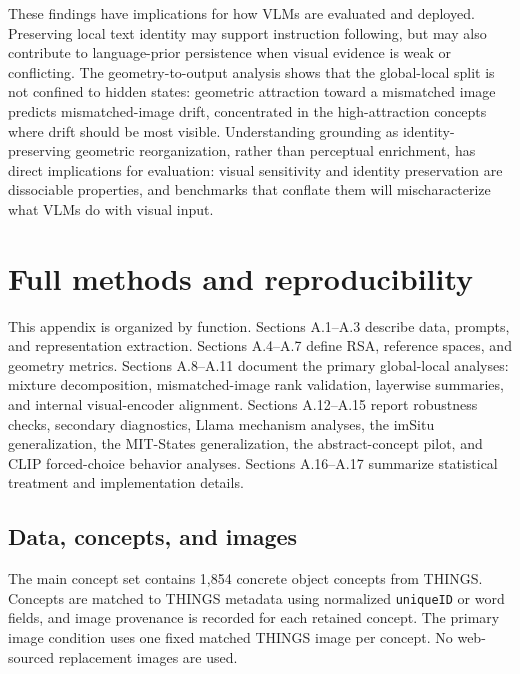 \documentclass{article}
\begin{document}
These findings have implications for how VLMs are evaluated and deployed. Preserving local text identity may support instruction following, but may also contribute to language-prior persistence when visual evidence is weak or conflicting. The geometry-to-output analysis shows that the global-local split is not confined to hidden states: geometric attraction toward a mismatched image predicts mismatched-image drift, concentrated in the high-attraction concepts where drift should be most visible. Understanding grounding as identity-preserving geometric reorganization, rather than perceptual enrichment, has direct implications for evaluation: visual sensitivity and identity preservation are dissociable properties, and benchmarks that conflate them will mischaracterize what VLMs do with visual input.

\clearpage



\clearpage
\appendix

\section{Full methods and reproducibility}
\label{app:methods}

This appendix is organized by function. Sections A.1--A.3 describe data, prompts, and representation extraction. Sections A.4--A.7 define RSA, reference spaces, and geometry metrics. Sections A.8--A.11 document the primary global-local analyses: mixture decomposition, mismatched-image rank validation, layerwise summaries, and internal visual-encoder alignment. Sections A.12--A.15 report robustness checks, secondary diagnostics, Llama mechanism analyses, the imSitu generalization, the MIT-States generalization, the abstract-concept pilot, and CLIP forced-choice behavior analyses. Sections A.16--A.17 summarize statistical treatment and implementation details.

\subsection{Data, concepts, and images}

The main concept set contains 1,854 concrete object concepts from THINGS. Concepts are matched to THINGS metadata using normalized \texttt{uniqueID} or word fields, and image provenance is recorded for each retained concept. The primary image condition uses one fixed matched THINGS image per concept. No web-sourced replacement images are used.
\end{document}
